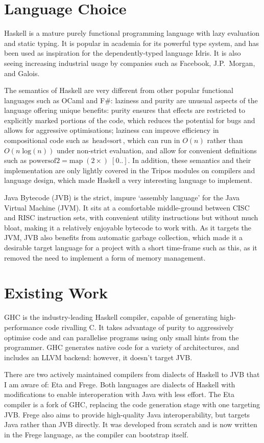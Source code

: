\documentclass[dissertation.tex]{subfiles}
\begin{document}
\section{Language Choice}
{
    Haskell is a mature purely functional programming language with lazy evaluation and static typing. It is popular in academia for its powerful type system, and has been used as inspiration for the dependently-typed language Idris\cite{Idris}. It is also seeing increasing industrial usage by companies such as Facebook\cite{FacebookHaskell}, J.P.\ Morgan\cite{JPHaskell}, and Galois\cite{GaloisHaskell}.

    The semantics of Haskell are very different from other popular functional languages such as OCaml and F\#: laziness and purity are unusual aspects of the language offering unique benefits: purity ensures that effects are restricted to explicitly marked portions of the code, which reduces the potential for bugs and allows for aggressive optimisations; laziness can improve efficiency in compositional code such as \(\text{head} \circ \text{sort}\), which can run in \(O(n)\) rather than \(O(n\;\text{log}(n))\) under non-strict evaluation, and allow for convenient definitions such as \(\text{powersof2} = \text{map}\;(2\times)\;[0..]\). In addition, these semantics and their implementation are only lightly covered in the Tripos modules on compilers and language design, which made Haskell a very interesting language to implement.

    Java Bytecode (JVB) is the strict, impure `assembly language' for the Java Virtual Machine (JVM). It sits at a comfortable middle-ground between CISC and RISC instruction sets, with convenient utility instructions but without much bloat, making it a relatively enjoyable bytecode to work with. As it targets the JVM, JVB also benefits from automatic garbage collection, which made it a desirable target language for a project with a short time-frame such as this, as it removed the need to implement a form of memory management.
}
\section{Existing Work}
{
    GHC is the industry-leading Haskell compiler, capable of generating high-performance code rivalling C. It takes advantage of purity to aggressively optimise code and can parallelise programs using only small hints from the programmer. GHC generates native code for a variety of architectures, and includes an LLVM backend: however, it doesn't target JVB.

    There are two actively maintained compilers from dialects of Haskell to JVB that I am aware of: Eta and Frege. Both languages are dialects of Haskell with modifications to enable interoperation with Java with less effort. The Eta compiler is a fork of GHC, replacing the code generation stage with one targeting JVB. Frege also aims to provide high-quality Java interoperability, but targets Java rather than JVB directly. It was developed from scratch and is now written in the Frege language, as the compiler can bootstrap itself. 
}
\end{document}
